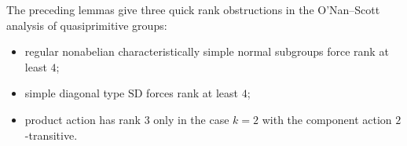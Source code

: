\begin{remark}
The preceding lemmas give three quick rank obstructions in the O'Nan--Scott analysis of quasiprimitive groups:
\begin{itemize}[leftmargin=2em]
    \item regular nonabelian characteristically simple normal subgroups force rank at least $4$;
    \item simple diagonal type $\mathrm{SD}$ forces rank at least $4$;
    \item product action has rank $3$ only in the case $k=2$ with the component action $2$-transitive.
\end{itemize}
\end{remark}